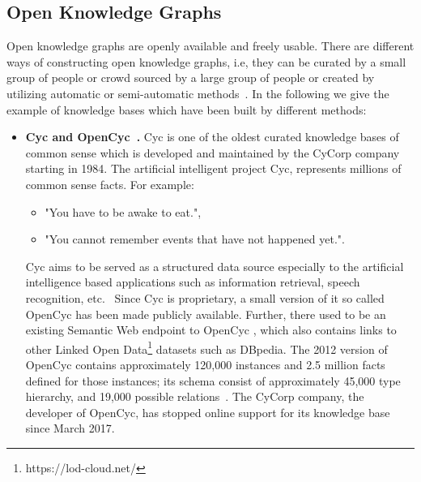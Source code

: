 \subsection{Open Knowledge Graphs}
Open knowledge graphs are openly available and freely usable. There are different ways of constructing open knowledge graphs, i.e, they can be curated by a small group of people or crowd sourced by a large group of people or created by utilizing automatic or semi-automatic methods~\cite{DBLP:journals/semweb/Paulheim17}. In the following we give the example of knowledge bases which have been built by different methods:
\begin{itemize}
\item \textbf{Cyc and OpenCyc~\cite{DBLP:journals/cacm/Lenat95}.} Cyc is one of the oldest curated knowledge bases of common sense which is developed and maintained by the CyCorp company starting in 1984. The artificial intelligent project Cyc, represents millions of common sense facts. For example:
\begin{itemize}
\item"You have to be awake to eat.", 
\item"You cannot remember events that have not happened yet.".
\end{itemize}
Cyc aims to be served as a structured data source especially to the artificial intelligence based applications such as information retrieval, speech recognition, etc.~\cite{DBLP:journals/cacm/Lenat95}
Since Cyc is proprietary, a small version of it so called OpenCyc has been made publicly available. Further, there used to be an existing Semantic Web endpoint to OpenCyc%
, which also contains links to other Linked Open Data\footnote{https://lod-cloud.net/} datasets such as DBpedia. The 2012 version of OpenCyc contains approximately 120,000 instances and 2.5 million facts defined for those instances; its schema consist of approximately 45,000 type hierarchy, and 19,000 possible relations~\cite{DBLP:journals/semweb/Paulheim17}. The CyCorp company, the developer of OpenCyc, has stopped online support for its knowledge base since March 2017.\\


\end{itemize}
